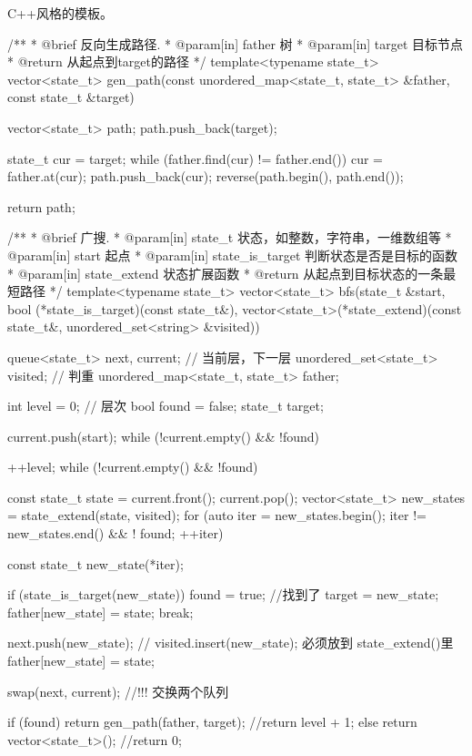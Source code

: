C++风格的模板。
\begin{Codex}[label=bfs_template1.cpp]
/**
 * @brief 反向生成路径.
 * @param[in] father 树
 * @param[in] target 目标节点
 * @return 从起点到target的路径
 */
template<typename state_t>
vector<state_t> gen_path(const unordered_map<state_t, state_t> &father,
        const state_t &target) {
    vector<state_t> path;
    path.push_back(target);

    state_t cur = target;
    while (father.find(cur) != father.end()) {
        cur = father.at(cur);
        path.push_back(cur);
    }
    reverse(path.begin(), path.end());

    return path;
}

/**
 * @brief 广搜.
 * @param[in] state_t 状态，如整数，字符串，一维数组等
 * @param[in] start 起点
 * @param[in] state_is_target 判断状态是否是目标的函数
 * @param[in] state_extend 状态扩展函数
 * @return 从起点到目标状态的一条最短路径
 */
template<typename state_t>
vector<state_t> bfs(state_t &start, bool (*state_is_target)(const state_t&),
        vector<state_t>(*state_extend)(const state_t&,
                unordered_set<string> &visited)) {
    queue<state_t> next, current; // 当前层，下一层
    unordered_set<state_t> visited; // 判重
    unordered_map<state_t, state_t> father;

    int level = 0;  // 层次
    bool found = false;
    state_t target;

    current.push(start);
    while (!current.empty() && !found) {
        ++level;
        while (!current.empty() && !found) {
            const state_t state = current.front();
            current.pop();
            vector<state_t> new_states = state_extend(state, visited);
            for (auto iter = new_states.begin();
                    iter != new_states.end() && ! found; ++iter) {
                const state_t new_state(*iter);

                if (state_is_target(new_state)) {
                    found = true; //找到了
                    target = new_state;
                    father[new_state] = state;
                    break;
                }

                next.push(new_state);
                // visited.insert(new_state); 必须放到 state_extend()里
                father[new_state] = state;
            }
        }
        swap(next, current); //!!! 交换两个队列
    }

    if (found) {
        return gen_path(father, target);
        //return level + 1;
    } else {
        return vector<state_t>();
        //return 0;
    }
}
\end{Codex}

